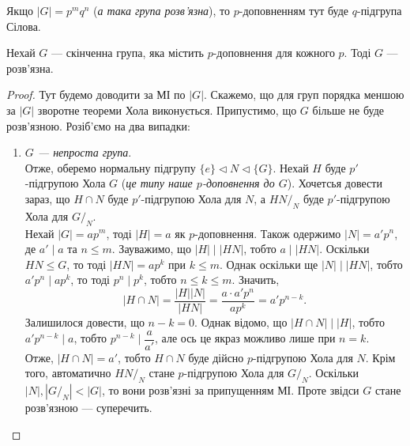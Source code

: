 \documentclass{math_library}
\begin{document}
\begin{remark}
Якщо $|G| = p^m q^n$ (\textit{а така група розв'язна}), то $p$-доповненням тут буде $q$-підгрупа Сілова.
\end{remark}

\begin{theorem}
Нехай $G$ --- скінченна група, яка містить $p$-доповнення для кожного $p$. Тоді $G$ --- розв'язна.
\end{theorem}

\begin{proof}
Тут будемо доводити за МІ по $|G|$. Скажемо, що для груп порядка меншою за $|G|$ зворотне теореми Хола виконується. Припустимо, що $G$ більше не буде розв'язною. Розіб'ємо на два випадки:
\begin{enumerate}[wide=0pt,label={\Roman*.}]
\item \textit{$G$ --- непроста група}.\\
Отже, оберемо нормальну підгрупу $\{e\} \triangleleft N \triangleleft \{G\}$. Нехай $H$ буде $p'$-підгрупою Хола $G$ (\textit{це типу наше $p$-доповнення до $G$}). Хочетсья довести зараз, що $H \cap N$ буде $p'$-підгрупою Хола для $N$, а $HN/_N$ буде $p'$-підгрупою Хола для $G/_N$. \\
Нехай $|G| = ap^m$, тоді $|H| = a$ як $p$-доповнення. Також одержимо $|N| = a' p^n$, де $a' \mid a$ та $n \leq m$. Зауважимо, що $|H| \mid |HN|$, тобто $a \mid |HN|$. Оскільки $HN \leq G$, то тоді $|HN| = ap^k$ при $k \leq m$. Однак оскільки ще $|N| \mid |HN|$, тобто $a' p^n \mid ap^k$, то тоді $p^n \mid p^k$, тобто $n \leq k \leq m$. Значить, 
\[
|H \cap N| = \dfrac{|H| |N|}{|HN|} = \dfrac{a \cdot a' p^n}{a p^{k}} = a' p^{n-k}.
\]
Залишилося довести, що $n-k = 0$. Однак відомо, що $|H \cap N| \mid |H|$, тобто $a' p^{n-k} \mid a$, тобто $p^{n-k} \mid \dfrac{a}{a'}$, але ось це якраз можливо лише при $n = k$.\\
Отже, $|H \cap N| = a'$, тобто $H \cap N$ буде дійсно $p$-підгрупою Хола для $N$. Крім того, автоматично $HN/_N$ стане $p$-підгрупою Хола для $G/_N$. Оскільки $|N|, |G/_N| < |G|$, то вони розв'язні за припущенням МІ. Проте звідси $G$ стане розв'язною --- суперечить.


\end{enumerate}
\end{proof}
\end{document}
